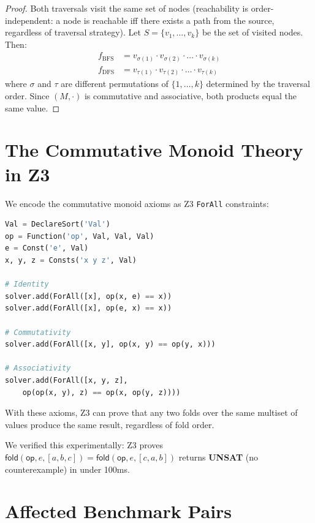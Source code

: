 \documentclass[11pt,a4paper]{report}
\theoremstyle{definition}
\theoremstyle{plain}
\newcommand{\fold}{\mathsf{fold}}
\newcommand{\op}{\mathsf{op}}
\begin{document}
\begin{proof}
Both traversals visit the same set of nodes (reachability is
order-independent: a node is reachable iff there exists a path from the
source, regardless of traversal strategy).  Let $S = \{v_1, \ldots,
v_k\}$ be the set of visited nodes.  Then:
\begin{align}
  f_{\mathrm{BFS}} &= v_{\sigma(1)} \cdot v_{\sigma(2)} \cdot \ldots
    \cdot v_{\sigma(k)} \\
  f_{\mathrm{DFS}} &= v_{\tau(1)} \cdot v_{\tau(2)} \cdot \ldots
    \cdot v_{\tau(k)}
\end{align}
where $\sigma$ and $\tau$ are different permutations of $\{1, \ldots,
k\}$ determined by the traversal order.  Since $(M, \cdot)$ is
commutative and associative, both products equal the same value.
\end{proof}

\section{The Commutative Monoid Theory in Z3}

We encode the commutative monoid axioms as Z3 \texttt{ForAll} constraints:

\begin{lstlisting}[language=Python,caption={Z3 commutative monoid}]
Val = DeclareSort('Val')
op = Function('op', Val, Val, Val)
e = Const('e', Val)
x, y, z = Consts('x y z', Val)

# Identity
solver.add(ForAll([x], op(x, e) == x))
solver.add(ForAll([x], op(e, x) == x))

# Commutativity
solver.add(ForAll([x, y], op(x, y) == op(y, x)))

# Associativity
solver.add(ForAll([x, y, z],
    op(op(x, y), z) == op(x, op(y, z))))
\end{lstlisting}

With these axioms, Z3 can prove that any two folds over the same
multiset of values produce the same result, regardless of fold order.

We verified this experimentally: Z3 proves
$\fold(\op, e, [a,b,c]) = \fold(\op, e, [c,a,b])$ returns
\textbf{UNSAT} (no counterexample) in under 100ms.

\section{Affected Benchmark Pairs}
\end{document}
